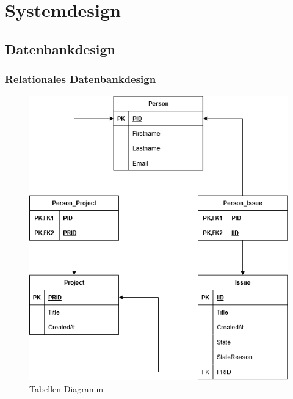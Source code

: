 \chapter{Systemdesign} %
\label{sec:systemdesign}

\section{Datenbankdesign} %
\label{sec:datenbankdesign}
\subsection{Relationales Datenbankdesign} %
\label{sec:relationalesdatenbankdesign}
\begin{figure}[h!]
	\centering
	\includegraphics[scale=0.7]{Illustrations/table_diagram.png}
	\caption{Tabellen Diagramm}
\end{figure}

